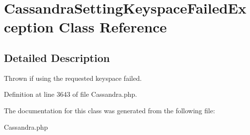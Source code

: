 \hypertarget{classCassandraSettingKeyspaceFailedException}{
\section{CassandraSettingKeyspaceFailedException Class Reference}
\label{classCassandraSettingKeyspaceFailedException}
}


\subsection{Detailed Description}
Thrown if using the requested keyspace failed. 

Definition at line 3643 of file Cassandra.php.



The documentation for this class was generated from the following file:\begin{DoxyCompactItemize}
\item 
Cassandra.php\end{DoxyCompactItemize}
